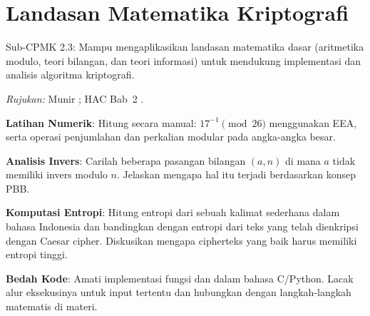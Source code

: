 \documentclass[main.tex]{subfiles}
\begin{document}
\chapter{Landasan Matematika Kriptografi}

\begin{subcpmk}
  \item Sub-CPMK 2.3: Mampu mengaplikasikan landasan matematika dasar (aritmetika modulo, teori bilangan, dan teori informasi) untuk mendukung implementasi dan analisis algoritma kriptografi.
\end{subcpmk}

\noindent\textit{Rujukan:} Munir \cite{munir2019,munir_slides_itb}; HAC Bab~2 \cite{menezes1996,hac_online}.











\begin{aktivitas}
  \item \textbf{Latihan Numerik}: Hitung secara manual: $17^{-1} \pmod{26}$ menggunakan EEA, serta operasi penjumlahan dan perkalian modular pada angka-angka besar.
  \item \textbf{Analisis Invers}: Carilah beberapa pasangan bilangan $(a, n)$ di mana $a$ tidak memiliki invers modulo $n$. Jelaskan mengapa hal itu terjadi berdasarkan konsep PBB.
  \item \textbf{Komputasi Entropi}: Hitung entropi dari sebuah kalimat sederhana dalam bahasa Indonesia dan bandingkan dengan entropi dari teks yang telah dienkripsi dengan Caesar cipher. Diskusikan mengapa cipherteks yang baik harus memiliki entropi tinggi.
  \item \textbf{Bedah Kode}: Amati implementasi fungsi  dan  dalam bahasa C/Python. Lacak alur eksekusinya untuk input tertentu dan hubungkan dengan langkah-langkah matematis di materi.
\end{aktivitas}
\end{document}

